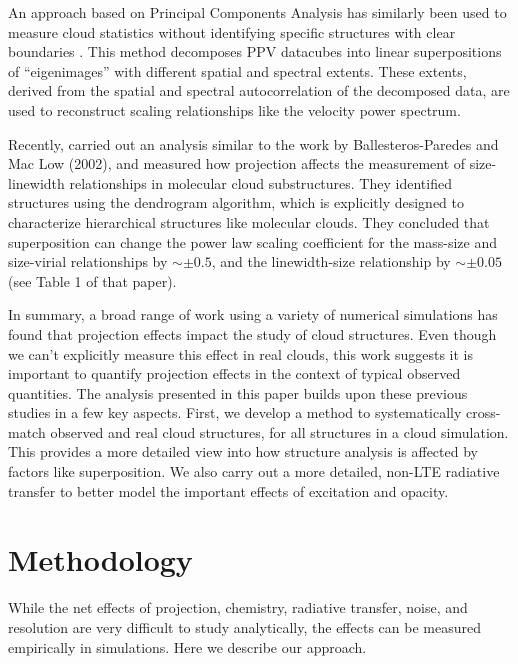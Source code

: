 An approach based on Principal Components Analysis has similarly been used to measure cloud statistics without identifying specific structures with clear boundaries \citep{http://adsabs.harvard.edu/abs/1997ApJ...475..173H, http://adsabs.harvard.edu/abs/2002ApJ...566..276B, http://adsabs.harvard.edu/abs/2013MNRAS.433..117B}. This method decomposes PPV datacubes into linear superpositions of ``eigenimages'' with different spatial and spectral extents. These extents, derived from the spatial and spectral autocorrelation of the decomposed data, are used to reconstruct scaling relationships like the velocity power spectrum.

Recently, \cite{http://adsabs.harvard.edu/abs/2010ApJ...712.1049S} carried out an analysis similar to the work by Ballesteros-Paredes and Mac Low (2002), and measured how projection affects the measurement of size-linewidth relationships in molecular cloud substructures. They identified structures using the dendrogram algorithm, which is explicitly designed to characterize hierarchical structures like molecular clouds. They concluded that superposition can change the power law scaling coefficient for the mass-size and size-virial relationships by $\sim \pm 0.5$, and the linewidth-size relationship by $\sim \pm 0.05$ (see Table 1 of that paper).

In summary, a broad range of work using a variety of numerical simulations has found that projection effects impact the study of cloud structures. Even though we can't explicitly measure this effect in real clouds, this work suggests it is important to quantify projection effects in the context of typical observed quantities. The analysis presented in this paper builds upon these previous studies in a few key aspects. First, we develop a method to systematically cross-match observed and real cloud structures,
for all structures in a cloud simulation. This provides a more detailed view into how structure analysis is affected by factors like superposition. We also carry out a more detailed, non-LTE radiative
transfer to better model the important effects of excitation and opacity.


\section{Methodology}
\label{sec:method}
While the net effects of projection, chemistry, radiative transfer, noise, and resolution are very difficult to study analytically, the effects can be measured empirically in simulations.  Here we describe our approach.

